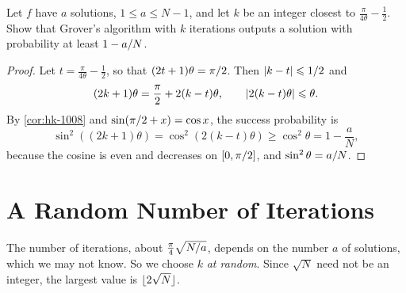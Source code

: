 \begin{exercisebox}
\begin{exercise}\label{ex:iterations-1008}\label{thm:iterations-1008}
    Let $f$ have $a$ solutions, $1 \leq a \leq N - 1$, and let $k$ be an integer closest to
    $\frac{\pi}{4\theta} - \frac{1}{2}$. Show that Grover's algorithm with $k$ iterations outputs a
    solution with probability at least $1 - a/N$.
\end{exercise}
\tcblower
\begin{proof}
    Let $t = \frac{\pi}{4\theta} - \frac{1}{2}$, so that $(2t+1)\theta = \pi/2$. Then
    $\left\lvert k - t\right\rvert \leqslant 1/2$ and
    \[(2k+1)\theta = \frac{\pi}{2} + 2(k-t)\theta, \qquad \left\lvert2(k-t)\theta\right\rvert \leqslant \theta.\]
    By \cref{cor:hk-1008} and $\sin(\pi/2 + x) = \cos x$, the success probability is
    \[\sin^2\left((2k+1)\theta\right) = \cos^2\left(2(k-t)\theta\right) \geq \cos^2\theta = 1 - \frac{a}{N},\]
    because the cosine is even and decreases on $[0, \pi/2]$, and $\sin^2\theta = a/N$.
\end{proof}
\end{exercisebox}

\section{A Random Number of Iterations}\label{sec:randomk-1008}

The number of iterations, about $\frac{\pi}{4}\sqrt{N/a}$, depends on the number $a$ of
solutions, which we may not know. So we choose $k$ \emph{at random}. Since $\sqrt{N}$ need not be an
integer, the largest value is $\floor{2\sqrt{N}}$.

